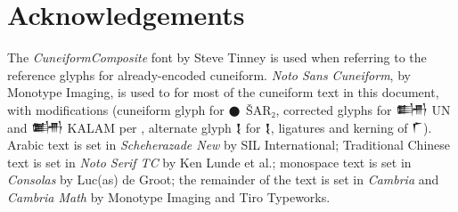 \documentclass[10pt, a4paper, twoside]{article}
\newcommand\oneEighthIkuC{{\proposalfont\symbol{"12587}}}
\newcommand\oneBurʾuC{{\proposalfont\symbol{"1258E}}}
\newcommand\fiveBurʾuC{{\proposalfont\symbol{"12592}}}
\newcommand\oneBanTwoC{{\proposalfont\symbol{"12593}}}
\newcommand\fiveBanTwoC{{\proposalfont\symbol{"12597}}}
\begin{document}
\section*{Acknowledgements}


The \emph{CuneiformComposite} font by Steve Tinney is used when referring to the reference glyphs for already-encoded cuneiform.
\emph{Noto Sans Cuneiform}, by Monotype Imaging,
is used to for most of the cuneiform text in this document, with modifications (cuneiform glyph for {\xsuxfont 𒊹} ŠAR₂,
corrected glyphs for {\xsuxfont 𒌦} UN and {\xsuxfont 𒌧} KALAM per \cite{Unicode16},
alternate glyph {\xsuxfont{} 𒋙} for {\xsuxfont 𒋙}, ligatures and kerning of {\xsuxfont 𒇲}).
Arabic text is set in \emph{Scheherazade New} by SIL International;
Traditional Chinese text is set in \emph{Noto Serif TC} by Ken Lunde et al.;
monospace text is set in \emph{Consolas} by Luc(as) de Groot;
the remainder of the text is set in \emph{Cambria} and \emph{Cambria Math} by Monotype Imaging and Tiro Typeworks.
\printbibheading[heading=bibintoc]
\printbibliography[heading=subbibintoc,title={Artefacts},type=artwork]
\printbibliography[heading=subbibintoc,title={ISO and Unicode documents},nottype=artwork,keyword=unicode]
\printbibliography[heading=subbibintoc,title={Online corpora and related projects},nottype=artwork,keyword=reference]
\printbibliography[heading=subbibintoc,title={Other documents},nottype=artwork,notkeyword=unicode,notkeyword=reference]
%
\end{document}
